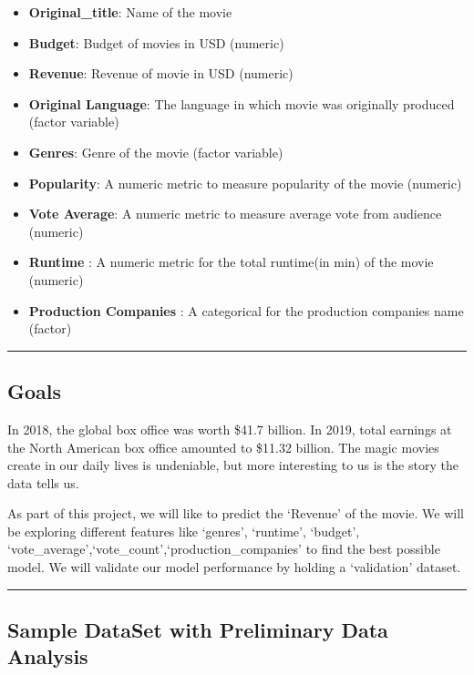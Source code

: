 \documentclass[
]{article}
\providecommand{\tightlist}{%
  \setlength{\itemsep}{0pt}\setlength{\parskip}{0pt}}
\begin{document}
\begin{itemize}
\tightlist
\item
  \textbf{Original\_title}: Name of the movie
\item
  \textbf{Budget}: Budget of movies in USD (numeric)
\item
  \textbf{Revenue}: Revenue of movie in USD (numeric)
\item
  \textbf{Original Language}: The language in which movie was originally
  produced (factor variable)
\item
  \textbf{Genres}: Genre of the movie (factor variable)
\item
  \textbf{Popularity}: A numeric metric to measure popularity of the
  movie (numeric)
\item
  \textbf{Vote Average}: A numeric metric to measure average vote from
  audience (numeric)
\item
  \textbf{Runtime} : A numeric metric for the total runtime(in min) of
  the movie (numeric)
\item
  \textbf{Production Companies} : A categorical for the production
  companies name (factor)
\end{itemize}

\begin{center}\rule{0.5\linewidth}{0.5pt}\end{center}

\hypertarget{goals}{%
\subsection{Goals}\label{goals}}

In 2018, the global box office was worth \$41.7 billion. In 2019, total
earnings at the North American box office amounted to \$11.32 billion.
The magic movies create in our daily lives is undeniable, but more
interesting to us is the story the data tells us.

As part of this project, we will like to predict the `Revenue' of the
movie. We will be exploring different features like `genres', `runtime',
`budget', `vote\_average',`vote\_count',`production\_companies' to find
the best possible model. We will validate our model performance by
holding a `validation' dataset.

\begin{center}\rule{0.5\linewidth}{0.5pt}\end{center}

\hypertarget{sample-dataset-with-preliminary-data-analysis}{%
\subsection{Sample DataSet with Preliminary Data
Analysis}\label{sample-dataset-with-preliminary-data-analysis}}
\end{document}
